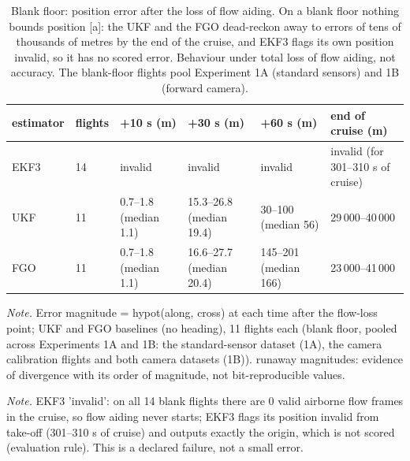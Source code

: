 \begin{table}[htbp]
\centering
\footnotesize
\caption{Blank floor: position error after the loss of flow aiding. On a blank floor nothing bounds position [a]: the UKF and the FGO dead-reckon away to errors of tens of thousands of metres by the end of the cruise, and EKF3 flags its own position invalid, so it has no scored error. Behaviour under total loss of flow aiding, not accuracy. The blank-floor flights pool Experiment 1A (standard sensors) and 1B (forward camera).}
\label{tab:T3}
\begin{tabular}{p{}p{}p{}p{}p{}p{}}
\toprule
\textbf{estimator} & \textbf{flights} & \textbf{+10 s (m)} & \textbf{+30 s (m)} & \textbf{+60 s (m)} & \textbf{end of cruise (m)} \\
\midrule
EKF3 & 14 & invalid & invalid & invalid & invalid (for 301--310 s of cruise) \\
UKF & 11 & 0.7--1.8 (median 1.1) & 15.3--26.8 (median 19.4) & 30--100 (median 56) \textdagger{} & 29\,000--40\,000 \textdagger{} \\
FGO & 11 & 0.7--1.8 (median 1.1) & 16.6--27.7 (median 20.4) & 145--201 (median 166) \textdagger{} & 23\,000--41\,000 \textdagger{} \\
\bottomrule
\end{tabular}
\par\smallskip\raggedright
\textit{Note.} Error magnitude = hypot(along, cross) at each time after the flow-loss point; UKF and FGO baselines (no heading), 11 flights each (blank floor, pooled across Experiments 1A and 1B: the standard-sensor dataset (1A), the camera calibration flights and both camera datasets (1B)). \textdagger{} runaway magnitudes: evidence of divergence with its order of magnitude, not bit-reproducible values.\par
\textit{Note.} EKF3 'invalid': on all 14 blank flights there are 0 valid airborne flow frames in the cruise, so flow aiding never starts; EKF3 flags its position invalid from take-off (301--310 s of cruise) and outputs exactly the origin, which is not scored (evaluation rule). This is a declared failure, not a small error.\par

\end{table}
